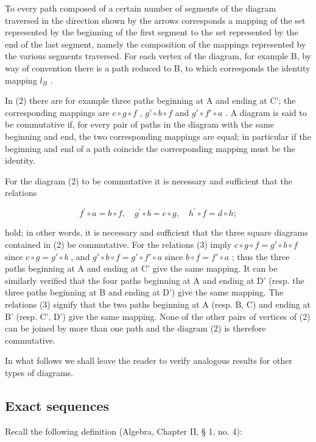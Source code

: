 To every path composed of a certain number of segments of the diagram traversed in the direction shown by the arrows corresponds a mapping of the set represented by the beginning of the first segment to the set represented by the end of the last segment, namely the composition of the mappings represented by the various segments traversed. For each vertex of the diagram, for example B, by way of convention there is a path reduced to B, to which corresponds the identity mapping \(l_{B}\) .

In (2) there are for example three paths beginning at A and ending at C'; the corresponding mappings are \(c \circ g \circ f\) , \(g' \circ b \circ f\) and \(g' \circ f' \circ a\) . A diagram is said to be commutative if, for every pair of paths in the diagram with the same beginning and end, the two corresponding mappings are equal; in particular if the beginning and end of a path coincide the corresponding mapping must be the identity.

For the diagram (2) to be commutative it is necessary and sufficient that the relations

\[
f ^ {\prime} \circ a = b \circ f, \quad g ^ {\prime} \circ b = c \circ g, \quad h ^ {\prime} \circ f = d \circ h;\tag{3}
\]

hold; in other words, it is necessary and sufficient that the three square diagrams contained in (2) be commutative. For the relations (3) imply \(c \circ g \circ f = g' \circ b \circ f\) since \(c \circ g = g' \circ b\) , and \(g' \circ b \circ f = g' \circ f' \circ a\) since \(b \circ f = f' \circ a\) ; thus the three paths beginning at A and ending at C' give the same mapping. It can be similarly verified that the four paths beginning at A and ending at D' (resp. the three paths beginning at B and ending at D') give the same mapping. The relations (3) signify that the two paths beginning at A (resp. B, C) and ending at B' (resp. C', D') give the same mapping. None of the other pairs of vertices of (2) can be joined by more than one path and the diagram (2) is therefore commutative.

In what follows we shall leave the reader to verify analogous results for other types of diagrams.

\subsection{Exact sequences}

Recall the following definition (Algebra, Chapter II, § 1, no. 4):

